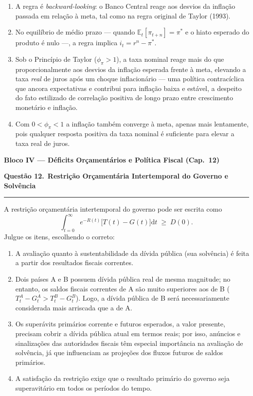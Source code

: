 \documentclass[12pt, a4paper]{article}
\newcommand{\E}{\mathbb{E}}
\newcommand{\dif}{\mathrm{d}}
\newcommand{\provaquestao}[2]{%
  \par\vspace{0.9em}%
  {\large\bfseries\color{cyanrbc} Questão #1.}\ {\bfseries #2}\par
  \vspace{-0.45em}\rule{\linewidth}{0.4pt}\par\vspace{0.1em}}
\begin{document}
\begin{enumerate}[label=\alph*)]
\item A regra é \emph{backward-looking}: o Banco Central reage aos desvios da
inflação passada em relação à meta, tal como na regra original de Taylor
(1993).
\item No equilíbrio de médio prazo --- quando $\E_t[\pi_{t+n}] = \pi^*$ e o
hiato esperado do produto é nulo ---, a regra implica $i_t = r^n - \pi^*$.
\item Sob o Princípio de Taylor ($\phi_\pi > 1$), a taxa nominal reage mais do
que proporcionalmente aos desvios da inflação esperada frente à meta, elevando
a taxa \emph{real} de juros após um choque inflacionário --- uma política
contracíclica que ancora expectativas e contribui para inflação baixa e
estável, a despeito do fato estilizado de correlação positiva de longo prazo
entre crescimento monetário e inflação.
\item Com $0 < \phi_\pi < 1$ a inflação também converge à meta, apenas mais
lentamente, pois qualquer resposta positiva da taxa nominal é suficiente para
elevar a taxa real de juros.
\end{enumerate}

\begin{center}
{\large\bfseries\color{cyanrbc} Bloco IV --- Déficits Orçamentários e Política Fiscal (Cap.\ 12)}
\end{center}

\provaquestao{12}{Restrição Orçamentária Intertemporal do Governo e Solvência}

A restrição orçamentária intertemporal do governo pode ser escrita como
\[
\int_{t=0}^{\infty} e^{-R(t)}\bigl[T(t) - G(t)\bigr]\dif t \;\geq\; D(0).
\]
Julgue os itens, escolhendo o correto:

\begin{enumerate}[label=\alph*)]
\item A avaliação quanto à sustentabilidade da dívida pública (sua solvência) é
feita a partir dos resultados fiscais correntes.
\item Dois países A e B possuem dívida pública real de mesma magnitude; no
entanto, os saldos fiscais correntes de A são muito superiores aos de B
($T_t^A - G_t^A > T_t^B - G_t^B$). Logo, a dívida pública de B será
necessariamente considerada mais arriscada que a de A.
\item Os superávits primários corrente e futuros esperados, a valor presente,
precisam cobrir a dívida pública atual em termos reais; por isso, anúncios e
sinalizações das autoridades fiscais têm especial importância na avaliação de
solvência, já que influenciam as projeções dos fluxos futuros de saldos
primários.
\item A satisfação da restrição exige que o resultado primário do governo seja
superavitário em todos os períodos do tempo.
\end{enumerate}
\end{document}
